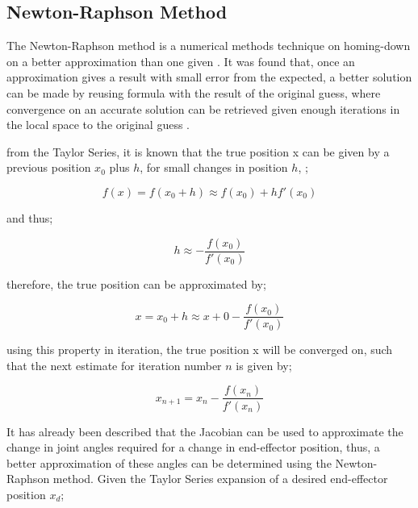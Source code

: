 \documentclass[12pt,openany,a4paper]{book}
\begin{document}
\subsection{Newton-Raphson Method}
The Newton-Raphson method is a numerical methods technique on homing-down on a better approximation than one given \cite{iKineBasic}. It was found that, once an approximation gives a result with small error from the expected, a better solution can be made by reusing formula with the result of the original guess, where convergence on an accurate solution can be retrieved given enough iterations in the local space to the original guess \cite{numericalMeth}.

from the Taylor Series, it is known that the true position x can be given by a previous position $x_0$ plus $h$, for small changes in position $h$, ;

\vspace{\baselineskip}
\begin{equation}
f(x) = f(x_0 + h) \approx f(x_0) + h f'(x_0)
\end{equation}

\vspace{\baselineskip}
and thus;

\vspace{\baselineskip}
\begin{equation}
h \approx - \frac{f(x_0)}{f'(x_0)}
\end{equation}

\vspace{\baselineskip}
therefore, the true position can be approximated by;

\vspace{\baselineskip}
\begin{equation}
x = x_0 + h \approx x+0 - \frac{f(x_0)}{f'(x_0)}
\end{equation}

\vspace{\baselineskip}
using this property in iteration, the true position x will be converged on, such that the next estimate for iteration number $n$ is given by;

\vspace{\baselineskip}
\begin{equation}
x_{n+1} = x_n - \frac{f(x_n)}{f'(x_n)}
\end{equation}

\vspace{\baselineskip}
It has already been described that the Jacobian can be used to approximate the change in joint angles required for a change in end-effector position, thus, a better approximation of these angles can be determined using the Newton-Raphson method. Given the Taylor Series expansion of a desired end-effector position $x_d$;
\end{document}
